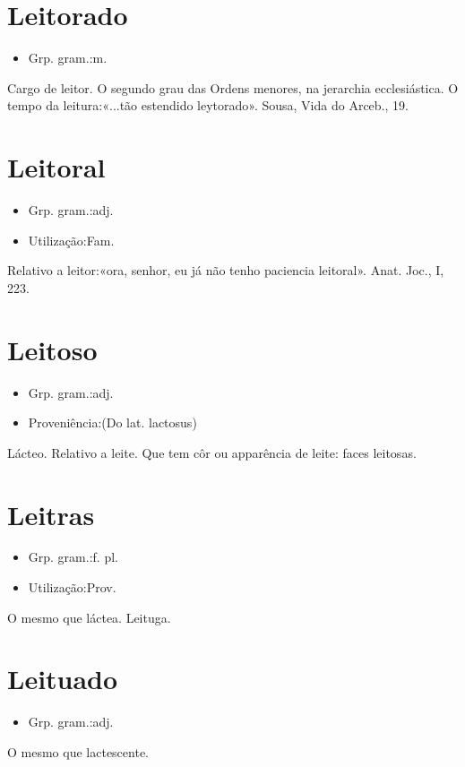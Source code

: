 \section{Leitorado}
\begin{itemize}
\item {Grp. gram.:m.}
\end{itemize}
Cargo de leitor.
O segundo grau das Ordens menores, na jerarchia ecclesiástica.
O tempo da leitura:«\textunderscore ...tão estendido leytorado\textunderscore ». Sousa, \textunderscore Vida do Arceb.\textunderscore , 19.
\section{Leitoral}
\begin{itemize}
\item {Grp. gram.:adj.}
\end{itemize}
\begin{itemize}
\item {Utilização:Fam.}
\end{itemize}
Relativo a leitor:«\textunderscore ora, senhor, eu já não tenho paciencia leitoral\textunderscore ». \textunderscore Anat. Joc.\textunderscore , I, 223.
\section{Leitoso}
\begin{itemize}
\item {Grp. gram.:adj.}
\end{itemize}
\begin{itemize}
\item {Proveniência:(Do lat. \textunderscore lactosus\textunderscore )}
\end{itemize}
Lácteo.
Relativo a leite.
Que tem côr ou apparência de leite: \textunderscore faces leitosas\textunderscore .
\section{Leitras}
\begin{itemize}
\item {Grp. gram.:f. pl.}
\end{itemize}
\begin{itemize}
\item {Utilização:Prov.}
\end{itemize}
O mesmo que \textunderscore láctea\textunderscore .
Leituga.
\section{Leituado}
\begin{itemize}
\item {Grp. gram.:adj.}
\end{itemize}
O mesmo que \textunderscore lactescente\textunderscore .
